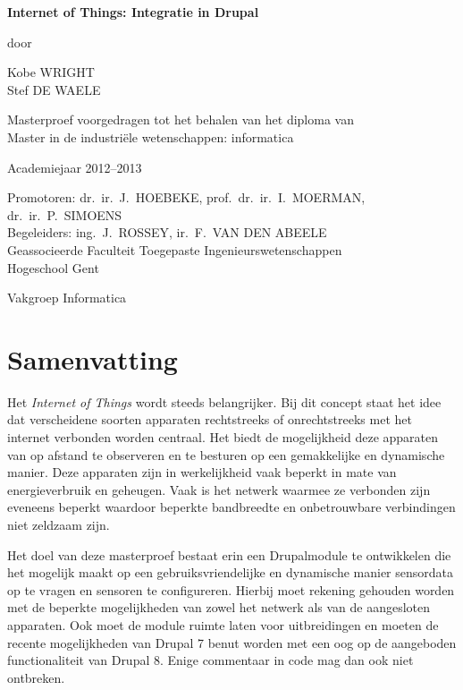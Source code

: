 
\newpage

{
\setlength{\baselineskip}{14pt}
\setlength{\parindent}{0pt}
\setlength{\parskip}{8pt}

\begin{center}

\noindent \textbf{\huge
Internet of Things: Integratie in Drupal
}

door 

Kobe WRIGHT\\
Stef DE WAELE

Masterproef voorgedragen tot het behalen van het diploma van\\
Master in de industri\"{e}le wetenschappen: informatica

Academiejaar 2012--2013

Promotoren: dr.~ir.~J.~HOEBEKE, prof.~dr.~ir.~I.~MOERMAN, dr.~ir.~P.~SIMOENS\\
Begeleiders: ing.~J.~ROSSEY, ir.~F.~VAN DEN ABEELE\\

Geassocieerde Faculteit Toegepaste Ingenieurswetenschappen\\
Hogeschool Gent

Vakgroep Informatica

\end{center}

\section*{Samenvatting}


Het \textit{Internet of Things} wordt steeds belangrijker. Bij dit concept staat het idee dat verscheidene soorten apparaten rechtstreeks of onrechtstreeks met het internet verbonden worden centraal. Het biedt de mogelijkheid deze apparaten van op afstand te observeren en te besturen op een gemakkelijke en dynamische manier. Deze apparaten zijn in werkelijkheid vaak beperkt in mate van energieverbruik en geheugen. Vaak is het netwerk waarmee ze verbonden zijn eveneens beperkt waardoor beperkte bandbreedte en onbetrouwbare verbindingen niet zeldzaam zijn.

Het doel van deze masterproef bestaat erin een Drupalmodule te ontwikkelen die het mogelijk maakt op een gebruiksvriendelijke en dynamische manier sensordata op te vragen en sensoren te configureren. Hierbij moet rekening gehouden worden met de beperkte mogelijkheden van zowel het netwerk als van de aangesloten apparaten. Ook moet de module ruimte laten voor uitbreidingen en moeten de recente mogelijkheden van Drupal 7 benut worden met een oog op de aangeboden functionaliteit van Drupal 8. Enige commentaar in code mag dan ook niet ontbreken.

}

